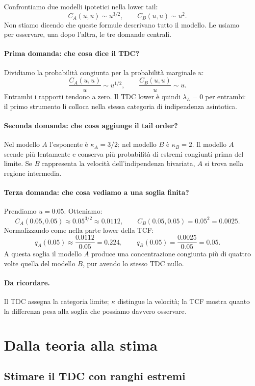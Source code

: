 \documentclass[11pt,a4paper]{article}
\newcommand{\Ricorda}{\paragraph{Da ricordare.}}
\begin{document}
Confrontiamo due modelli ipotetici nella lower tail:
\[
 C_A(u,u)\sim u^{3/2},
 \qquad
 C_B(u,u)\sim u^2.
\]
Non stiamo dicendo che queste formule descrivano tutto il modello. Le usiamo
per osservare, una dopo l'altra, le tre domande centrali.

\paragraph{Prima domanda: che cosa dice il TDC?}
Dividiamo la probabilità congiunta per la probabilità marginale $u$:
\[
 \frac{C_A(u,u)}{u}\sim u^{1/2},
 \qquad
 \frac{C_B(u,u)}{u}\sim u.
\]
Entrambi i rapporti tendono a zero. Il TDC lower è quindi $\lambda_L=0$ per
entrambi: il primo strumento li colloca nella stessa categoria di indipendenza
asintotica.

\paragraph{Seconda domanda: che cosa aggiunge il tail order?}
Nel modello $A$ l'esponente è $\kappa_A=3/2$; nel modello $B$ è
$\kappa_B=2$. Il modello $A$ scende più lentamente e conserva più probabilità
di estremi congiunti prima del limite. Se $B$ rappresenta la velocità
dell'indipendenza bivariata, $A$ si trova nella regione intermedia.

\paragraph{Terza domanda: che cosa vediamo a una soglia finita?}
Prendiamo $u=0.05$. Otteniamo:
\[
 C_A(0.05,0.05)\approx0.05^{3/2}\approx0.0112,
 \qquad
 C_B(0.05,0.05)=0.05^2=0.0025.
\]
Normalizzando come nella parte lower della TCF:
\[
 q_A(0.05)\approx\frac{0.0112}{0.05}=0.224,
 \qquad
 q_B(0.05)=\frac{0.0025}{0.05}=0.05.
\]
A questa soglia il modello $A$ produce una concentrazione congiunta più di
quattro volte quella del modello $B$, pur avendo lo stesso TDC nullo.

\Ricorda Il TDC assegna la categoria limite; $\kappa$ distingue la velocità;
la TCF mostra quanto la differenza pesa alla soglia che possiamo davvero
osservare.

\section{Dalla teoria alla stima}

\subsection{Stimare il TDC con ranghi estremi}
\end{document}
